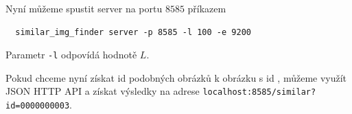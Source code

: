 Nyní můžeme spustit server na portu $8585$ příkazem

\begin{lstlisting}
  similar_img_finder server -p 8585 -l 100 -e 9200
\end{lstlisting}

Parametr \lstinline{-l} odpovídá hodnotě $L$.

Pokud chceme nyní získat id podobných obrázků k obrázku s id , můžeme využít JSON HTTP API a získat výsledky na adrese \lstinline{localhost:8585/similar?id=0000000003}.





